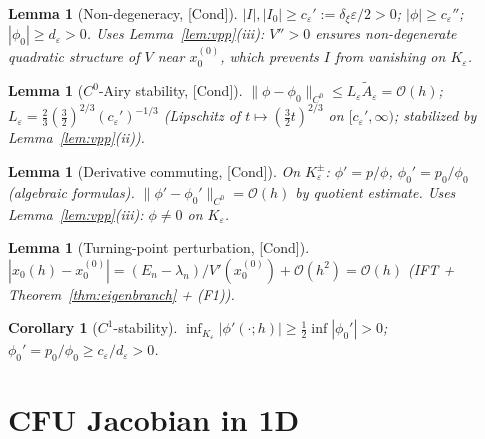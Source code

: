 \documentclass[12pt,a4paper]{amsart}
\newtheorem{lemma}[theorem]{Lemma}
\newtheorem{corollary}[theorem]{Corollary}
\theoremstyle{definition}
\theoremstyle{remark}
\newcommand{\Cond}{\textup{[Cond]}}
\begin{document}
\begin{lemma}[Non-degeneracy, \Cond]
\label{lem:nondeg}
$|I|,|I_0|\ge c_\varepsilon':=\delta_\xi\varepsilon/2>0$;
$|\phi|\ge c_\varepsilon''$; $|\phi_0|\ge d_\varepsilon>0$.
\emph{Uses Lemma~\ref{lem:vpp}(iii): $V''>0$ ensures
non-degenerate quadratic structure of $V$ near $x_0^{(0)}$,
which prevents $I$ from vanishing on $K_\varepsilon$.}
\end{lemma}

\begin{lemma}[$C^0$-Airy stability, \Cond]
\label{lem:C0-airy}
$\|\phi-\phi_0\|_{C^0}\le L_\varepsilon\tilde A_\varepsilon=\mathcal{O}(h)$;
$L_\varepsilon=\tfrac23(\tfrac32)^{2/3}(c_\varepsilon')^{-1/3}$
(Lipschitz of $t\mapsto(\tfrac32 t)^{2/3}$ on $[c_\varepsilon',\infty)$;
stabilized by Lemma~\ref{lem:vpp}(ii)).
\end{lemma}

\begin{lemma}[Derivative commuting, \Cond]
\label{lem:deriv-commuting}
On $K_\varepsilon^\pm$:
$\phi'=p/\phi$, $\phi_0'=p_0/\phi_0$ (algebraic formulas).
$\|\phi'-\phi_0'\|_{C^0}=\mathcal{O}(h)$ by quotient estimate.
\emph{Uses Lemma~\ref{lem:vpp}(iii): $\phi\ne 0$ on $K_\varepsilon$.}
\end{lemma}

\begin{lemma}[Turning-point perturbation, \Cond]
\label{lem:tp-perturbation}
$|x_0(h)-x_0^{(0)}|=(E_n-\lambda_n)/V'(x_0^{(0)})+\mathcal{O}(h^2)=\mathcal{O}(h)$
(IFT + Theorem~\ref{thm:eigenbranch} + (F1)).
\end{lemma}

\begin{corollary}[$C^1$-stability]
\label{cor:phi-C1}
$\inf_{K_\varepsilon}|\phi'(\cdot;h)|\ge\tfrac12\inf|\phi_0'|>0$;
$\phi_0'=p_0/\phi_0\ge c_\varepsilon/d_\varepsilon>0$.
\end{corollary}

\section{CFU Jacobian in 1D}
\label{sec:cfu-jacobian}
\end{document}

